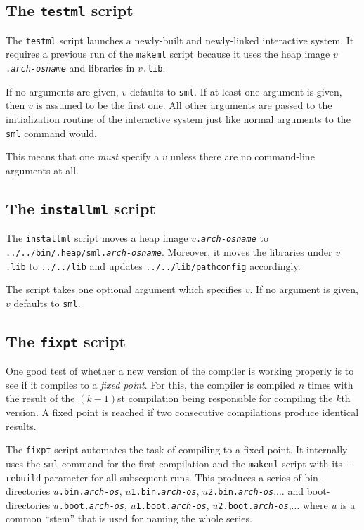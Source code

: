 \subsection{The {\tt testml} script}

The {\tt testml} script launches a newly-built and newly-linked
interactive system.  It requires a previous run of the {\tt makeml}
script because it uses the heap image {\tt $v$.{\it arch}-{\it osname}}
and libraries in {\tt $v$.lib}.

If no arguments are given, $v$ defaults to {\tt sml}.  If at least one
argument is given, then $v$ is assumed to be the first one. All other
arguments are passed to the initialization routine of the interactive
system just like normal arguments to the {\tt sml} command would.

This means that one {\em must} specify a $v$ unless there are no
command-line arguments at all.

\subsection{The {\tt installml} script}

The {\tt installml} script moves a heap image {\tt $v$.{\it arch}-{\it osname}}
to {\tt ../../bin/.heap/sml.{\it arch}-{\it osname}}.  Moreover, it
moves the libraries under {\tt $v$.lib} to {\tt ../../lib} and updates
{\tt ../../lib/pathconfig} accordingly.

The script takes one optional argument which specifies $v$.  If no
argument is given, $v$ defaults to {\tt sml}.

\subsection{The {\tt fixpt} script}

One good test of whether a new version of the compiler is working
properly is to see if it compiles to a {\em fixed point}.  For this,
the compiler is compiled $n$ times with the result of the $(k-1)$st
compilation being responsible for compiling the $k$th version.
A fixed point is reached if two consecutive compilations produce
identical results.

The {\tt fixpt} script automates the task of compiling to a fixed
point.  It internally uses the {\tt sml} command for the first
compilation and the {\tt makeml} script with its {\tt -rebuild}
parameter for all subsequent runs.  This produces a series of bin-directories
{\tt $u$.bin.{\it arch}-{\it os}},
{\tt $u$1.bin.{\it arch}-{\it os}},
{\tt $u$2.bin.{\it arch}-{\it os}},$\ldots$
and boot-directories
{\tt $u$.boot.{\it arch}-{\it os}},
{\tt $u$1.boot.{\it arch}-{\it os}},
{\tt $u$2.boot.{\it arch}-{\it os}},$\ldots$
where $u$ is a common ``stem'' that is used for naming the whole series.

